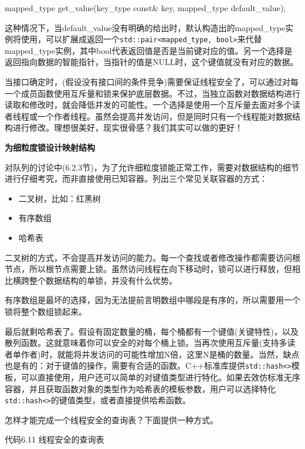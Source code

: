 \begin{cpp}
mapped_type get_value(key_type const& key, mapped_type default_value);
\end{cpp}

这种情况下，当default\_value没有明确的给出时，默认构造出的mapped\_type实例将使用，可以扩展成返回一个\texttt{std::pair<mapped\_type, bool>}来代替mapped\_type实例，其中bool代表返回值是否是当前键对应的值。另一个选择是返回指向数据的智能指针，当指针的值是NULL时，这个键值就没有对应的数据。

当接口确定时，(假设没有接口间的条件竞争)需要保证线程安全了，可以通过对每一个成员函数使用互斥量和锁来保护底层数据。不过，当独立函数对数据结构进行读取和修改时，就会降低并发的可能性。一个选择是使用一个互斥量去面对多个读者线程或一个作者线程。虽然会提高并发访问，但是同时只有一个线程能对数据结构进行修改。理想很美好，现实很骨感？我们其实可以做的更好！

\textbf{为细粒度锁设计映射结构}

对队列的讨论中(6.2.3节)，为了允许细粒度锁能正常工作，需要对数据结构的细节进行仔细考究，而非直接使用已知容器。列出三个常见关联容器的方式：

\begin{itemize}
  \item 二叉树，比如：红黑树
  \item 有序数组
  \item 哈希表
\end{itemize}

二叉树的方式，不会提高并发访问的能力。每一个查找或者修改操作都需要访问根节点，所以根节点需要上锁。虽然访问线程在向下移动时，锁可以进行释放，但相比横跨整个数据结构的单锁，并没有什么优势。

有序数组是最坏的选择，因为无法提前言明数组中哪段是有序的，所以需要用一个锁将整个数组锁起来。

最后就剩哈希表了。假设有固定数量的桶，每个桶都有一个键值(关键特性)，以及散列函数。这就意味着你可以安全的对每个桶上锁。当再次使用互斥量(支持多读者单作者)时，就能将并发访问的可能性增加N倍，这里N是桶的数量。当然，缺点也是有的：对于键值的操作，需要有合适的函数。C++标准库提供\texttt{std::hash<>}模板，可以直接使用，用户还可以简单的对键值类型进行特化。如果去效仿标准无序容器，并且获取函数对象的类型作为哈希表的模板参数，用户可以选择特化\texttt{std::hash<>}的键值类型，或者直接提供哈希函数。

怎样才能完成一个线程安全的查询表？下面提供一种方式。

代码6.11 线程安全的查询表

